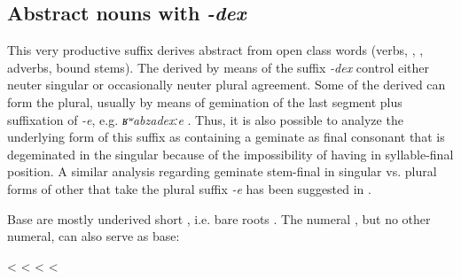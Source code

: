 
\subsection{Abstract nouns with \textit{-dex}}
\label{ssec:Abstract nouns with -dex}

This very productive suffix derives abstract  from open class words (verbs, , , adverbs, bound stems). The  derived by means of the suffix \textit{-dex} control either neuter singular  or occasionally neuter plural agreement. Some of the derived  can form the plural, usually by means of gemination of the last segment plus suffixation of \textit{-e}, e.g. \textit{ʁʷabzadexːe} . Thus, it is also possible to analyze the underlying form of this suffix as containing a geminate as final consonant that is degeminated in the singular because of the impossibility of having  in syllable-final position. A similar analysis regarding geminate stem-final  in singular vs. plural forms of other  that take the plural suffix \textit{-e} has been suggested in . 

Base  are mostly underived short , i.e. bare roots . The numeral  , but no other numeral, can also serve as base: 
%
\begin{exe}
	\ex	\label{kːuš-dexhunger}
	\begin{xlist}
		\TabPositions{14em,16em}
		\ex	{} 	\tab	<	\tab	{} 
		\ex	{} 	\tab	<	\tab	{} 
		\ex	{} 	\tab	<	\tab	{} 
		\ex	{} 		\tab	<	\tab	{} 
	\end{xlist}
\end{exe}

